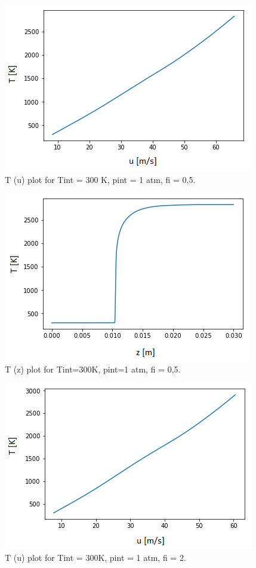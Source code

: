 \documentclass[11pt]{article}
\begin{document}
\begin{figure} [H]
	\begin{center}
\includegraphics[height=0.5\textwidth]{P9}
        \caption{T (u) plot for Tint = 300 K, pint = 1 atm, fi = 0,5.}
    \end{center}
\end{figure}

\begin{figure} [H]
	\begin{center}
\includegraphics[height=0.5\textwidth]{P10}
        \caption{T (z) plot for Tint=300K, pint=1 atm, fi = 0,5.}
    \end{center}
\end{figure}

\begin{figure} [H]
	\begin{center}
\includegraphics[height=0.5\textwidth]{P11}
        \caption{T (u) plot for Tint = 300K, pint = 1 atm, fi = 2.}
    \end{center}
\end{figure}
\end{document}
